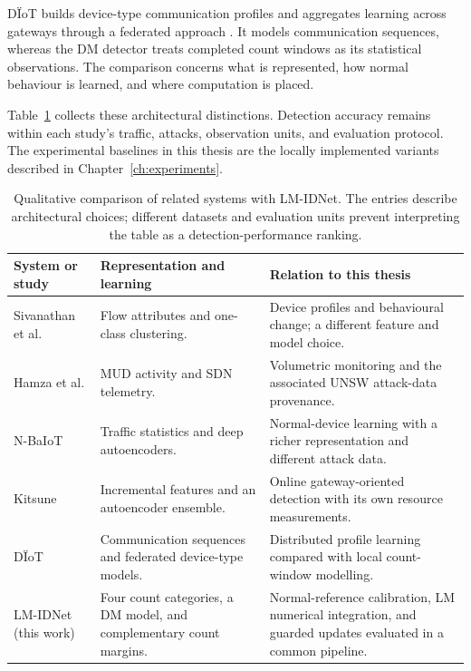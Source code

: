 D\"IoT builds device-type communication profiles and aggregates learning
across gateways through a federated approach \cite{nguyen2019}. It models
communication sequences, whereas the DM detector treats completed count
windows as its statistical observations. The comparison concerns what
is represented, how normal behaviour is learned, and where computation is
placed.

Table~\ref{tab:related-systems} collects these architectural distinctions.
Detection accuracy remains within each study's traffic, attacks, observation
units, and evaluation protocol. The experimental baselines in this thesis
are the locally implemented variants described in Chapter~\ref{ch:experiments}.

\begin{table}[tbp]
\centering
\small
\begin{tabular}{@{}>{\raggedright\arraybackslash}p{}
  >{\raggedright\arraybackslash}p{}
  >{\raggedright\arraybackslash}p{}@{}}
\toprule
\textbf{System or study} & \textbf{Representation and learning} &
\textbf{Relation to this thesis} \\
\midrule
Sivanathan et al. \cite{sivanathan2020} &
Flow attributes and one-class clustering. &
Device profiles and behavioural change; a different feature and model choice. \\
Hamza et al. \cite{hamza2019} &
MUD activity and SDN telemetry. &
Volumetric monitoring and the associated UNSW attack-data provenance. \\
N-BaIoT \cite{meidan2018} &
Traffic statistics and deep autoencoders. &
Normal-device learning with a richer representation and different attack data. \\
Kitsune \cite{mirsky2018} &
Incremental features and an autoencoder ensemble. &
Online gateway-oriented detection with its own resource measurements. \\
D\"IoT \cite{nguyen2019} &
Communication sequences and federated device-type models. &
Distributed profile learning compared with local count-window modelling. \\
LM-IDNet (this work) &
Four count categories, a DM model, and complementary count margins. &
Normal-reference calibration, LM numerical integration, and guarded updates
evaluated in a common pipeline. \\
\bottomrule
\end{tabular}
\caption{Qualitative comparison of related systems with LM-IDNet. The entries
describe architectural choices; different datasets and evaluation units
prevent interpreting the table as a detection-performance ranking.}
\label{tab:related-systems}
\end{table}

